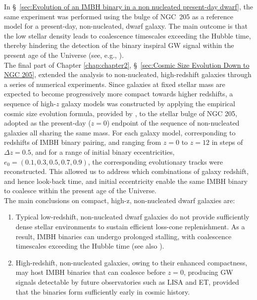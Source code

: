 \documentclass[12pt,twoside,openany]{book}
\begin{document}
In \S~\ref{sec:Evolution of an IMBH binary in a non nucleated present-day dwarf}, the same experiment was performed using the bulge of NGC~205 as a reference model for a present-day, non-nucleated, dwarf galaxy. The main outcome is that the low stellar density leads to coalescence timescales exceeding the Hubble time, thereby hindering the detection of the binary inspiral GW signal within the present age of the Universe (see, e.g., \citealt{Khan_2024}).\\The final part of Chapter \ref{chap:chapter2}, \S~\ref{sec:Cosmic Size Evolution Down to NGC 205}, extended the analysis to non-nucleated, high-redshift galaxies through a series of numerical experiments. Since galaxies at fixed stellar mass are expected to become progressively more compact towards higher redshifts, a sequence of high-$z$ galaxy models was constructed by applying the empirical cosmic size evolution formula, provided by \textcite{Ono_2023}, to the stellar bulge of NGC 205, adopted as the present-day ($z=0$) endpoint of the sequence of non-nucleated galaxies all sharing the same mass. For each galaxy model, corresponding to redshifts of IMBH binary pairing, and ranging from $z=0$ to $z=12$ in steps of $\Delta z=0.5$, and for a range of initial binary eccentricities, $e_0=(0.1,0.3,0.5,0.7,0.9)$, the corresponding evolutionary tracks were reconstructed. This allowed us to address which combinations of galaxy redshift, and hence look-back time, and initial eccentricity enable the same IMBH binary to coalesce within the present age of the Universe.\\The main conclusions on compact, high-z, non-nucleated dwarf galaxies are:
\begin{enumerate}
\item Typical low-redshift, non-nucleated dwarf galaxies do not provide sufficiently dense stellar environments to sustain efficient loss-cone replenishment. As a result, IMBH binaries can undergo prolonged stalling, with coalescence timescales exceeding the Hubble time (see also \citealt{Khan_2024}).
\item High-redshift, non-nucleated galaxies, owing to their enhanced compactness, may host IMBH binaries that can coalesce before $z=0$, producing GW signals detectable by future observatories such as LISA and ET, provided that the binaries form sufficiently early in cosmic history.
\end{enumerate}
\end{document}
